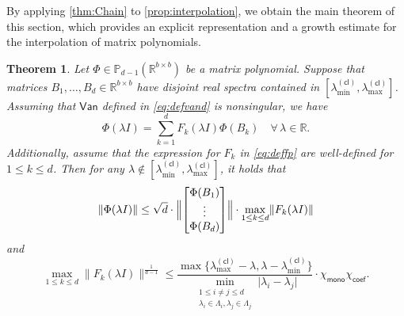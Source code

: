 \documentclass{article}
\newtheorem{theorem}{Theorem}
\newcommand{\van}{\mathsf{Van}}
\newcommand{\poly}{\mathbb{P}}
\newcommand{\chim}{\chi_{\mathsf{mono}}}
\newcommand{\chic}{\chi_{\mathsf{coef}}}
\newcommand{\cl}{(\mathsf{cl})}
\newcommand{\fp}{F}
\newcommand{\R}{\mathbb{R}}
\providecommand{\abs}[1]{\lvert#1\rvert}
\providecommand{\norm}[1]{\lVert#1\rVert}
\providecommand{\Bignorm}[1]{\Bigl\lVert#1\Bigr\rVert}
\begin{document}
By applying \cref{thm:Chain} to \cref{prop:interpolation}, we obtain the main theorem of this section, which provides an explicit representation and a growth estimate for the interpolation of matrix polynomials.
\begin{theorem}
    \label{thm:interpolation}
    Let $\Phi\in\poly_{d-1}(\R^{b\times b})$ be a matrix polynomial. Suppose that matrices $B_{1},\dotsc,B_{d}\in\R^{b\times b}$ have disjoint real spectra contained in $[\lambda_{\min}^{\cl},\lambda_{\max}^{\cl}]$. Assuming that $\van$ defined in \cref{eq:defvand} is nonsingular, we have   
    \begin{equation*}
        \Phi(\lambda I) = \sum_{k=1}^{d} \fp_{k}(\lambda I)\Phi(B_{k}) \quad \forall\, \lambda\in\R.
    \end{equation*} 
    Additionally, assume that the expression for $\fp_{k}$ in \cref{eq:deffp} are well-defined for $1\leq k\leq d$. Then for any $\lambda \notin [\lambda_{\min}^{\cl},\lambda_{\max}^{\cl}]$, it holds that 
    \begin{equation*}
        \norm{\Phi(\lambda I)} \leq \sqrt{d}\cdot
        \Bignorm{
        \begin{bmatrix}
         \Phi(B_{1})\\ 
         \vdots\\ 
            \Phi(B_{d})
        \end{bmatrix}}
        \cdot \max_{1\leq k\leq d}\norm{\fp_{k}(\lambda I)}
    \end{equation*}
    and
    \begin{equation}
        \label{eq:Gd}
        \max_{1\leq k\leq d} \norm{\fp_{k}(\lambda I)}^{\frac{1}{d-1}} \leq 
        \frac{\max\{\lambda_{\max}^{\cl}-\lambda,\lambda-\lambda_{\min}^{\cl}\}}{\min\limits_{\substack{1\leq i\neq j\leq d\\ \lambda_{i}\in \Lambda_{i}, \lambda_{j}\in \Lambda_{j}}} \abs{\lambda_{i}-\lambda_{j}}} \cdot \chim \chic.
    \end{equation}
\end{theorem}
\end{document}
